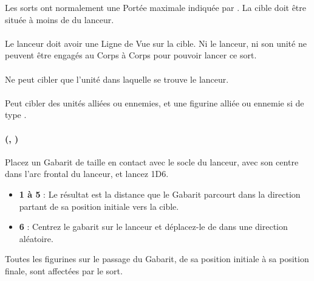 Les sorts ont normalement une Portée maximale indiquée par \og {} \fg{}. La cible doit être située à moins de  du lanceur.

\paragraph{\missile}

Le lanceur doit avoir une Ligne de Vue sur la cible. Ni le lanceur, ni son unité ne peuvent être engagés au Corps à Corps pour pouvoir lancer ce sort.

\paragraph{\castersunit}

Ne peut cibler que l'unité dans laquelle se trouve le lanceur.

\paragraph{\universal}

Peut cibler des unités alliées ou ennemies, et une figurine alliée ou ennemie si de type \focused{}.

\paragraph{\vortex{} (, \template{} )}

Placez un Gabarit de taille  en contact avec le socle du lanceur, avec son centre dans l'arc frontal du lanceur, et lancez 1D6.
\begin{itemize}[label={-}]
\item \textbf{1 à 5} :  Le résultat est la distance que le Gabarit parcourt dans la direction partant de sa position initiale vers la cible.
\item \textbf{6} : Centrez le gabarit sur le lanceur et déplacez-le de  dans une direction aléatoire.
\end{itemize}

Toutes les figurines sur le passage du Gabarit, de sa position initiale à sa position finale, sont affectées par le sort. 

